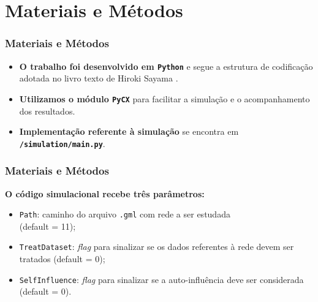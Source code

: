 
\section{Materiais e Métodos}

\begin{frame}
  \frametitle{Materiais e Métodos}

  \begin{alertblock}{}
    \vspace{5mm}

    \begin{itemize}
      \item \alert{\textbf{O trabalho foi desenvolvido em \texttt{Python}}} e
        segue a estrutura de codificação adotada no livro texto de Hiroki Sayama
        \cite{Sayama:2015:ComplexSystems}.
      \vspace{5mm}

      \item \alert{\textbf{Utilizamos o módulo \texttt{PyCX}}} para facilitar
        a simulação e o acompanhamento dos resultados.
      \vspace{5mm}

      \item \textbf{Implementação referente à simulação} se encontra em
        \textbf{\texttt{/simulation/main.py}}.
      \vspace{5mm}

    \end{itemize}
  \end{alertblock}
\end{frame}

\begin{frame}
  \frametitle{Materiais e Métodos}

  \vspace{-5mm}
  \textbf{O código simulacional recebe três parâmetros:}

  \begin{alertblock}{}
    \vspace{5mm}

    \begin{itemize}
      \item \texttt{Path}: caminho do arquivo \texttt{.gml} com rede a ser
        estudada \\ (default = 11);
      \vspace{5mm}

      \item \texttt{TreatDataset}: \textit{flag} para sinalizar se os dados
        referentes à rede devem ser tratados (default = 0);
      \vspace{5mm}

      \item \texttt{SelfInfluence}: \textit{flag} para sinalizar se a
        auto-influência deve ser considerada (default = 0).
      \vspace{5mm}

    \end{itemize}
  \end{alertblock}
\end{frame}


